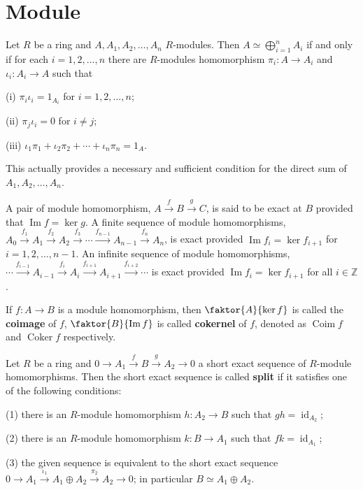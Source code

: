 \documentclass{article}
\DeclareMathOperator{\coim}{Coim}
\DeclareMathOperator{\coker}{Coker}
\begin{document}
\newpage
\section{Module}
\begin{theorem}
    Let $R$ be a ring and $A,A_{1},A_{2}, \ldots,A_{n}$ $R$-modules. Then $A\simeq \bigoplus_{i=1}^n A_{i}$ if and only if for each $i=1,2, \ldots,n$ there are $R$-modules homomorphism $\pi_i:A\to A_{i}$ and $\iota_i:A_{i}\to A$ such that

    (i) $\pi_i \iota_i = 1_{A_{i}}$ for $i=1,2, \ldots,n$;

    (ii) $\pi_{j} \iota_{i}=0$ for $i\neq j$;

    (iii) $\iota_{1}\pi_{1}+\iota_{2}\pi_{2}+ \cdots+\iota_{n}\pi_n=1_A$.
\end{theorem}
This actually provides a necessary and sufficient condition for the direct sum of $A_{1},A_{2}, \ldots,A_{n}$.

\begin{definition}
    A pair of module homomorphism, $A\xrightarrow{f}B\xrightarrow{g}C$, is said to be exact at $B$ provided that $\operatorname{Im}f=\operatorname{ker}g$. A finite sequence of module homomorphisms, $A_{0}\xrightarrow{f_{1}}A_{1}\xrightarrow{f_{2}}A_{2}\xrightarrow{f_{3}}\cdots\xrightarrow{f_{n-1}}A_{n-1}\xrightarrow{f_{n}}A_{n}$, is exact provided $\operatorname{Im}f_{i}=\operatorname{ker}f_{i+1} $ for $i=1,2, \ldots,n-1$. An infinite sequence of module homomorphisms, $\cdots\xrightarrow{f_{i-1}}A_{i-1}\xrightarrow{f_{i}}A_{i}\xrightarrow{f_{i+1}}A_{i+1}\xrightarrow{f_{i+2}}\cdots$ is exact provided $\operatorname{Im} f_{i}=\operatorname{ker} f_{i+1}$ for all $i \in \mathbb{Z}$.
\end{definition}

\begin{definition}
    If $f:A \to B$ is a module homomorphism, then $\faktor{A}{\operatorname{ker} f}$ is called the \textbf{coimage} of $f$, $\faktor{B}{\operatorname{Im} f}$ is called \textbf{cokernel} of $f$, denoted as $\coim f$ and $\coker f$ respectively.
\end{definition}

\begin{theorem}
    Let $R$ be a ring and $0\to A_{1}\xrightarrow{f}B\xrightarrow{g}A_{2}\to 0$ a short exact sequence of $R$-module homomorphisms. Then the short exact sequence is called \textbf{split} if it satisfies one of the following conditions:

    (1) there is an $R$-module homomorphism $h:A_{2}\to B$ such that $gh=\operatorname{id}_{A_{2}}$;

    (2) there is an $R$-module homomorphism $k:B\to A_{1}$ such that $fk=\operatorname{id}_{A_{1}}$;

    (3) the given sequence is equivalent to the short exact sequence $0\to A_{1}\xrightarrow{\iota_{1}}A_{1}\oplus A_{2}\xrightarrow{\pi_{2}}A_{2}\to 0$; in particular $B\simeq A_{1}\oplus A_{2}$.
\end{theorem}
\end{document}
